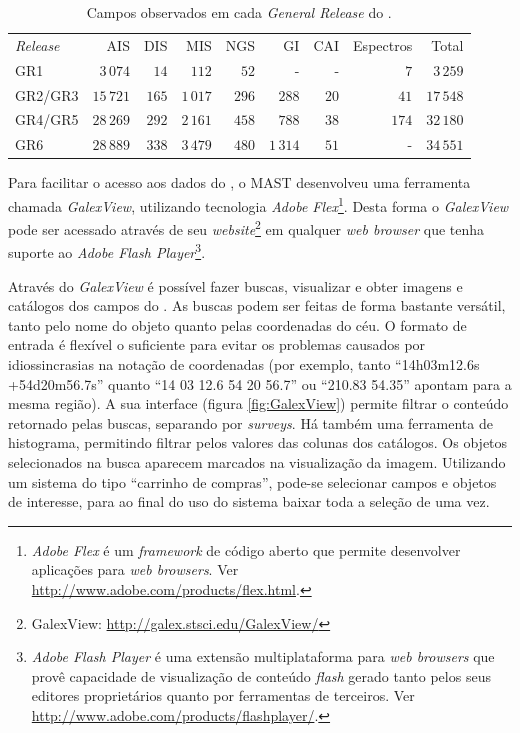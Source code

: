 \begin{table}
	\caption[Campos observados em cada {\em General Release} do \galex.]{Campos
	observados em cada {\em General Release} do \galex.}
	\begin{tabular}{l r r r r r r r r}
		{\em Release} & AIS       & DIS   & MIS      & NGS   &     GI   &  CAI & Espectros & Total     \\
		GR1           &  $3\,074$ &  $14$ &    $112$ &  $52$ &        - &    - &       $7$ &  $3\,259$ \\
		GR2/GR3       & $15\,721$ & $165$ & $1\,017$ & $296$ &    $288$ & $20$ &      $41$ & $17\,548$ \\
		GR4/GR5       & $28\,269$ & $292$ & $2\,161$ & $458$ &    $788$ & $38$ &     $174$ & $32\,180$ \\
		GR6           & $28\,889$ & $338$ & $3\,479$ & $480$ & $1\,314$ & $51$ &         - & $34\,551$ \\
	\end{tabular}
	\label{tab:GalexReleases}
\end{table}

Para facilitar o acesso aos dados do \galex, o MAST desenvolveu uma ferramenta
chamada {\em GalexView}, utilizando tecnologia {\em Adobe Flex}\footnote{{\em
Adobe Flex} é um {\em framework} de código aberto que permite desenvolver
aplicações para {\em web browsers}. Ver
\url{http://www.adobe.com/products/flex.html}.}. Desta forma o {\em GalexView }
pode ser acessado através de seu {\em website}\footnote{GalexView:
\url{http://galex.stsci.edu/GalexView/}} em qualquer {\em web browser} que tenha
suporte ao {\em Adobe Flash Player}\footnote{{\em Adobe Flash Player} é uma
extensão multiplataforma para {\em web browsers} que provê capacidade de
visualização de conteúdo {\em flash} gerado tanto pelos seus editores
proprietários quanto por ferramentas de terceiros. Ver
\url{http://www.adobe.com/products/flashplayer/}.}.

Através do {\em GalexView} é possível fazer buscas, visualizar e obter imagens e
catálogos dos campos do \galex. As buscas podem ser feitas de forma bastante
versátil, tanto pelo nome do objeto quanto pelas coordenadas do céu. O formato
de entrada é flexível o suficiente para evitar os problemas causados por
idiossincrasias na notação de coordenadas (por exemplo, tanto ``14h03m12.6s
+54d20m56.7s'' quanto ``14 03 12.6 54 20 56.7'' ou ``210.83 54.35'' apontam para
a mesma região). A sua interface (figura \ref{fig:GalexView}) permite filtrar o
conteúdo retornado pelas buscas, separando por {\em surveys}. Há também uma
ferramenta de histograma, permitindo filtrar pelos valores das colunas dos
catálogos. Os objetos selecionados na busca aparecem marcados na visualização da
imagem. Utilizando um sistema do tipo ``carrinho de compras'', pode-se
selecionar campos e objetos de interesse, para ao final do uso do sistema baixar
toda a seleção de uma vez.

